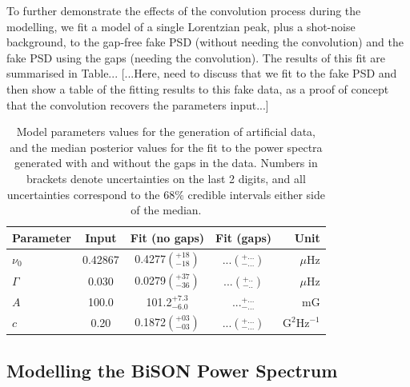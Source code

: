 To further demonstrate the effects of the convolution process during the modelling, we fit a model of a single Lorentzian peak, plus a shot-noise background, to the gap-free fake PSD (without needing the convolution) and the fake PSD using the gaps (needing the convolution). The results of this fit are summarised in Table... [...Here, need to discuss that we fit to the fake PSD and then show a table of the fitting results to this fake data, as a proof of concept that the convolution recovers the parameters input...]


\begin{table}[ht!]
	\begin{center}
		\caption{Model parameters values for the generation of artificial data, and the median posterior values for the fit to the power spectra generated with and without the gaps in the data. Numbers in brackets denote uncertainties on the last 2 digits, and all uncertainties correspond to the $68 \%$ credible intervals either side of the median.}
		\label{tab:fake_1pk_params}
		\begin{tabular}{l c c c r}
			\hline
			{\bf Parameter} & {\bf Input} & {\bf Fit (no gaps)} & {\bf Fit (gaps)} & {\bf Unit} \\
			\hline
			
			{$\nu_0$} & {0.42867} & {0.4277$\left(_{-18}^{+18}\right)$} & {...$\left(_{-...}^{+...}\right)$} & {$\mu\mathrm{Hz} $}\\
			
			{$\Gamma$} & {0.030} & {0.0279$\left(_{-36}^{+37}\right)$} & {...$\left(_{-..}^{+..}\right)$} & {$\mu\mathrm{Hz} $} \\
			
			{$A$} & {100.0} & {101.2$_{-6.0}^{+7.3}$} & {...$_{-...}^{+...}$} & {$\mathrm{mG}$} \\
					
			{$c$} & {0.20} & {0.1872$\left(_{-03}^{+03}\right)$} & {...$\left(_{-...}^{+...}\right)$} & {$\mathrm{G}^2\mathrm{Hz}^{-1}$} \\	
			
			\hline
		\end{tabular}
	\end{center}
\end{table}





\subsection{Modelling the BiSON Power Spectrum}\label{sec:BiSON_reults}

